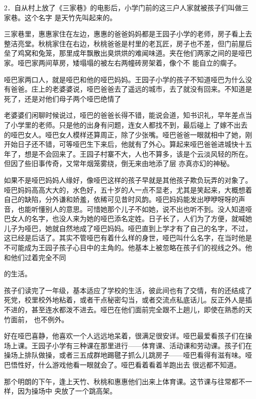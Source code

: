 \documentclass{article}
\begin{document}
2．自从村上放了《三家巷》的电影后，小学门前的这三户人家就被孩子们叫做三家巷。这个名字
是天竹先叫起来的。 

三家巷里，惠惠家住在左边，惠惠的爸爸妈妈都是王园子小学的老师，房子看上去整洁亮堂。秋桃家住在右边，秋桃爸爸是村里的老瓦匠，房子也不差，但门前屋后垒了鸡窝和兔笼，那里成年飘散出臭烘烘的难闻味道。夹在他们两家之间的是哑巴家。哑巴家两间草房，矮塌塌的被左右两幢砖房架着，像个不
能自立的瘸子。 

哑巴家两口人，就是哑巴和他的哑巴妈妈。王园子小学的孩子不知道哑巴为什么没有爸爸。庄上的老婆婆说，哑巴爸爸去了遥远的城市，去了就没有回来。不知道是死了，还是对他们母子两个哑巴绝情了

老婆婆们闲聊时候说过，哑巴的爸爸长得不错，能说会道，知书识礼，早年差点当了小学里的老师。只是他的出身有问题，连女人都找不到，最后碰上
\newpage
了嫁不出去的哑巴女人。哑巴女人模样还算周正，除了少张嘴。哑巴爸爸一眼就相中了她，刚开始日子还不错，可等哑巴生下来后，他就有了外心。算起来哑巴爸爸进城快十五年了，想是不会回来了。王园子村寨不大，人也不算多，该是个云淡风轻的所在。但因了些旧事传奇，又常年烟笼雾绕，倒无来由地添了层
亦真亦幻的神秘。 

如果不是哑巴妈妈人缘好，像哑巴这样的孩子早就是其他孩子欺负玩弄的对象了。哑巴妈妈高高大大的，水色好，五十岁的人一点不显老，尤其是笑起来，大概想着自己的缺陷，分外谦和娇羞，依稀可见昔时风韵。哑巴妈妈能发出咿咿呀呀的声音，也能听懂别人的意思。可惜她那个儿子不如她，说不出也听不到。没人知道哑巴女人的名字，也没人来为她的哑巴添名定姓。日子长了，人们为了方便，就喊她儿子为哑巴，她就自然地成了哑巴妈妈。哑巴直到上学才有了自己的名字，不过，这已经是后话了。其实不管哑巴有着什么样的身世，哑巴叫什么名字，在当时他是不可能成为王园子孩子心目中的主角的。他基本上被忽略在孩子们的视线之外。他和他们过着完全不同
\newpage

的生活。 

孩子们读完了一年级，基本适应了学校的生活，彼此间也有了交情，有的还结成了死党，校里校外地粘着，或者干点秘密勾当，或者交流点私底话儿。反正外人是插不进的，甚至连水都泼不进去。哑巴在他们面前完全跟不上趟儿，即使在熟悉的天竹面前，
也不例外。 

好在哑巴喜静，他喜欢一个人远远地呆着，很满足很安详。哑巴最爱看孩子们在操场上课。王园子小学有三种课在那里进行——体育课、活动课和劳动课。孩子们在操场上排队做操，或者三五成群地踢毽子抓么儿跳房子——哑巴看得有滋有味。哑巴悟性好，什么游戏他看一眼就会了。哑巴看着看着羊跑出去
很远都不知道。 

那个明朗的下午，逢上天竹、秋桃和惠惠他们出来上体育课。这节课与往常都不一样，因为操场中
央放了一个跳高架。 
\end{document}
